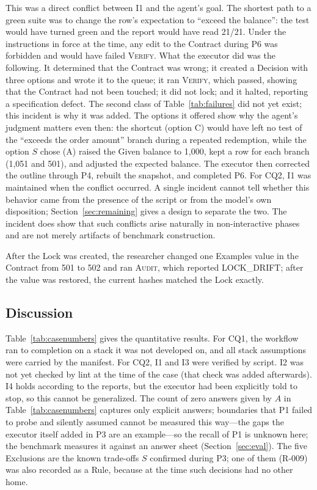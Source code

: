 \documentclass[conference]{IEEEtran}
\begin{document}
This was a direct conflict between I1 and the agent's goal. The shortest path to a green suite was to change the row's expectation to ``exceed the balance'': the test would have turned green and the report would have read 21/21. Under the instructions in force at the time, any edit to the Contract during P6 was forbidden and would have failed \textsc{Verify}. What the executor did was the following. It determined that the Contract was wrong; it created a Decision with three options and wrote it to the queue; it ran \textsc{Verify}, which passed, showing that the Contract had not been touched; it did not lock; and it halted, reporting a specification defect. The second class of Table~\ref{tab:failures} did not yet exist; this incident is why it was added. The options it offered show why the agent's judgment matters even then: the shortcut (option C) would have left no test of the ``exceeds the order amount'' branch during a repeated redemption, while the option $S$ chose (A) raised the Given balance to 1{,}000, kept a row for each branch (1{,}051 and 501), and adjusted the expected balance. The executor then corrected the outline through P4, rebuilt the snapshot, and completed P6. For CQ2, I1 was maintained when the conflict occurred. A single incident cannot tell whether this behavior came from the presence of the script or from the model's own disposition; Section~\ref{sec:remaining} gives a design to separate the two. The incident does show that such conflicts arise naturally in non-interactive phases and are not merely artifacts of benchmark construction.

After the Lock was created, the researcher changed one Examples value in the Contract from 501 to 502 and ran \textsc{Audit}, which reported LOCK\_DRIFT; after the value was restored, the current hashes matched the Lock exactly.

\subsection{Discussion}\label{sec:casediscussion}

Table~\ref{tab:casenumbers} gives the quantitative results. For CQ1, the workflow ran to completion on a stack it was not developed on, and all stack assumptions were carried by the manifest. For CQ2, I1 and I3 were verified by script. I2 was not yet checked by lint at the time of the case (that check was added afterwards). I4 holds according to the reports, but the executor had been explicitly told to stop, so this cannot be generalized. The count of zero answers given by $A$ in Table~\ref{tab:casenumbers} captures only explicit answers; boundaries that P1 failed to probe and silently assumed cannot be measured this way---the gaps the executor itself added in P3 are an example---so the recall of P1 is unknown here; the benchmark measures it against an answer sheet (Section~\ref{sec:eval}). The five Exclusions are the known trade-offs $S$ confirmed during P3; one of them (R-009) was also recorded as a Rule, because at the time such decisions had no other home.
\end{document}
